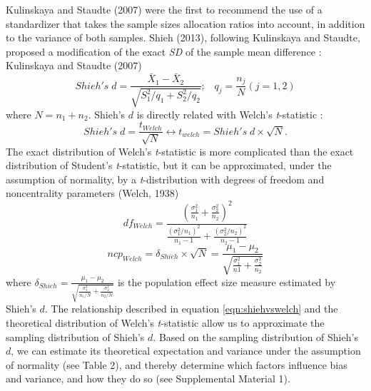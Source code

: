 \documentclass[
  english,
  man,floatsintext]{apa6}
\begin{document}
Kulinskaya and Staudte (2007) were the first to recommend the use of a standardizer that takes the sample sizes allocation ratios into account, in addition to the variance of both samples. Shieh (2013), following Kulinskaya and Staudte, proposed a modification of the exact \emph{SD} of the sample mean difference : \color{white} Kulinskaya and Staudte (2007) \color{black}
\begin{equation*} 
Shieh's \; d = \frac{\bar{X}_1 - \bar{X}_2}{\sqrt{S_1^2/q_1+S_2^2/q_2}}; \;\;\; q_j=\frac{n_j}{N} (j=1,2)
\label{eqn:Shiehds}
\end{equation*}
where \(N = n_1+n_2\). Shieh's \(d\) is directly related with Welch's \emph{t}-statistic :
\begin{equation} 
Shieh's \; d=\frac{t_{Welch}}{\sqrt{N}}\leftrightarrow t_{welch} = Shieh's \; d \times \sqrt{N}.
\label{eqn:shiehvswelch}
\end{equation}
The exact distribution of Welch's \emph{t}-statistic is more complicated than the exact distribution of Student's \emph{t}-statistic, but it can be approximated, under the assumption of normality, by a \emph{t}-distribution with degrees of freedom and noncentrality parameters (Welch, 1938)
\begin{equation} 
df_{Welch} = \frac{\left(\frac{\sigma^2_1}{n_1}+\frac{\sigma^2_2}{n_2} \right)^2}{\frac{(\sigma^2_1/n_1)^2}{n_1-1}+\frac{(\sigma^2_2/n_2)^2}{n_2-1}}
\label{eqn:welchdf}
\end{equation}
\begin{equation*} 
ncp_{Welch} = \delta_{Shieh} \times \sqrt{N} = \frac{\mu_1-\mu_2}{\sqrt{\frac{\sigma_1^2}{n1}+\frac{\sigma_2^2}{n_2}}}
\label{eqn:welchncp}
\end{equation*}
where \(\delta_{Shieh}=\frac{\mu_1-\mu_2}{\sqrt{\frac{\sigma_1^2}{n_1/N}+\frac{\sigma_2^2}{n_2/N}}}\) is the population effect size measure estimated by Shieh's \(d\). The relationship described in equation \ref{eqn:shiehvswelch} and the theoretical distribution of Welch's \emph{t}-statistic allow us to approximate the sampling distribution of Shieh's \(d\). Based on the sampling distribution of Shieh's \(d\), we can estimate its theoretical expectation and variance under the assumption of normality (see Table 2), and thereby determine which factors influence bias and variance, and how they do so (see Supplemental Material 1).
\end{document}
